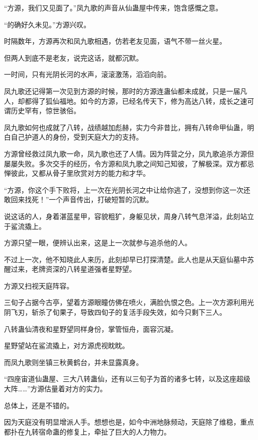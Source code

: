 
\begin{this_body}



“方源，我们又见面了。”凤九歌的声音从仙蛊屋中传来，饱含感慨之意。

“的确好久未见。”方源兴叹。

时隔数年，方源再次和凤九歌相遇，仿若老友见面，语气不带一丝火星。

但两人到底不是老友，说完这话，就都沉默。

一时间，只有光阴长河的水声，滚滚激荡，滔滔向前。

凤九歌还记得第一次见到方源的时候，那时的方源连蛊仙都未成就，只是一届凡人，却都得了狐仙福地。如今的方源，已经名传天下，修为高达八转，成长之速可谓历史罕有，惊世骇俗。

凤九歌如何也成就了八转，战绩越加彪赫，实力今非昔比，拥有八转命甲仙蛊，明白自己护道人的身份，受到天庭大力的支持。

方源曾经救过凤九歌一命，凤九歌也还了人情。因为阵营之分，凤九歌追杀方源但屡屡失败。多次交手的经历，令方源和凤九歌之间知己知彼，了解极深。双方都忌惮彼此，又都从骨子里欣赏对方的能力和才华。

“方源，你这个手下败将，上一次在光阴长河之中让给你逃了，没想到你这一次还敢回来找死！”一个声音传出，打破短暂的沉默。

说这话的人，身着湛蓝星甲，容貌粗犷，身躯见状，周身八转气息洋溢，此刻站立于鲨流撬上。

方源只望一眼，便辨认出来，这是上一次就参与追杀他的人。

不过上一次，他不知晓此人来历，此刻却早已打探清楚。此人也是从天庭仙墓中苏醒过来，老牌资深的八转星道强者星野望。

方源又扫视天庭阵容。

三旬子占据今古亭，望着方源眼瞳仿佛在喷火，满脸仇恨之色。上一次方源利用光阴飞刃，斩杀了旬果子，导致四旬子的复活手段失效，如今只剩下三人。

八转蛊仙清夜和星野望同样身份，掌管恒舟，面容沉凝。

星野望站在鲨流撬上，对方源虎视眈眈。

而凤九歌则坐镇三秋黄鹤台，并未显露真身。

“四座宙道仙蛊屋、三大八转蛊仙，还有以三旬子为首的诸多七转，以及这座超级大阵……”方源估量着对方的实力。

总体上，还是不错的。

因为天庭没有明显增派人手。想想也是，如今中洲地脉频动，天庭除了维稳，重点都扑在九转宿命蛊的修复上，牵扯了巨大的人力物力。


\end{this_body}

